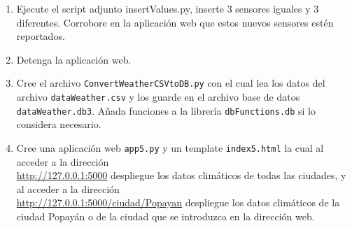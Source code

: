 \documentclass[10pt,letterpaper]{article}
\begin{document}
\begin{enumerate}
\item Ejecute el script adjunto insertValues.py, inserte 3 sensores iguales y 3 diferentes. Corrobore en la aplicación web que estos nuevos sensores estén reportados. 

\item Detenga la aplicación web. 

\item Cree el archivo \verb|ConvertWeatherCSVtoDB.py| con el cual lea los datos del archivo \verb|dataWeather.csv| y los guarde en el archivo base de datos \verb|dataWeather.db3|. Añada funciones a la librería \verb|dbFunctions.db| si lo considera necesario. 

\item Cree una aplicación web \verb|app5.py| y un template \verb|index5.html| la cual al acceder a la dirección  \\ \url{http://127.0.0.1:5000} despliegue los datos climáticos de todas las ciudades, y al acceder a la dirección \\ \url{http://127.0.0.1:5000/ciudad/Popayan} despliegue los datos climáticos de la ciudad Popayán o de la ciudad que se introduzca en la dirección web. 



\end{enumerate}
\end{document}
